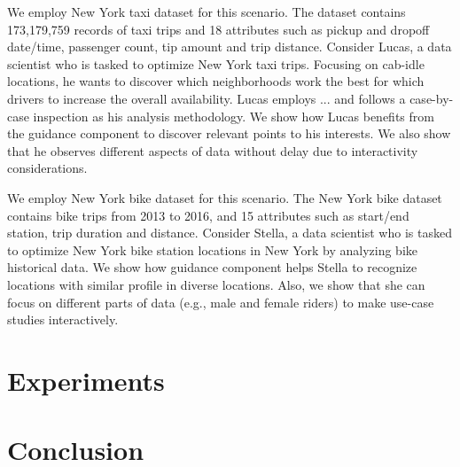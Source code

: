 \documentclass[runningheads,a4paper]{llncs}
\begin{document}
 We employ New York taxi dataset for this scenario. The  dataset contains 173,179,759 records of taxi trips and 18 attributes such as pickup and dropoff date/time, passenger count, tip amount and trip distance. Consider Lucas, a data scientist who is tasked to optimize New York taxi trips. Focusing on cab-idle locations, he wants to discover which neighborhoods work the best for which drivers to increase the overall availability. Lucas employs ... and follows a case-by-case inspection as his analysis methodology. We show how Lucas benefits from the guidance component to discover relevant points to his interests. We also show that he observes different aspects of data without delay due to interactivity considerations.

 We employ New York bike dataset for this scenario. The New York bike dataset contains bike trips from 2013 to 2016, and 15 attributes such as start/end station, trip duration and distance. Consider Stella, a data scientist who is tasked to optimize New York bike station locations in New York by analyzing bike historical data. We show how guidance component helps Stella to recognize locations with similar profile in diverse locations. Also, we show that she can focus on different parts of data (e.g., male and female riders) to make use-case studies interactively.


 
 \section{Experiments}


 
 

 
 \section{Conclusion}
 

\vspace{-5pt}



\end{document}

